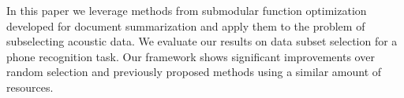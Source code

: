 In this paper we leverage methods from submodular function optimization developed for document summarization and apply them to the problem of
 subselecting acoustic data. We evaluate our results on data subset selection
 for a phone recognition task.  Our framework shows significant improvements
 over random selection and previously proposed methods using a similar amount of
 resources.

